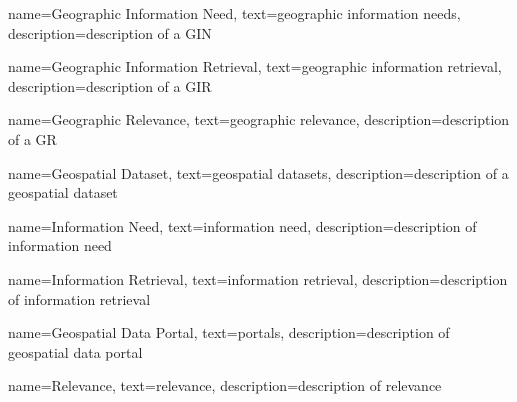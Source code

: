 
{
    name=Geographic Information Need,
    text=geographic information needs,
    description=description of a GIN
}

{
    name=Geographic Information Retrieval,
    text=geographic information retrieval,
    description=description of a GIR
}

{
    name=Geographic Relevance,
    text=geographic relevance,
    description=description of a GR
}

{
    name=Geospatial Dataset,
    text=geospatial datasets,
    description=description of a geospatial dataset
}

{
    name=Information Need,
    text=information need,
    description=description of information need
}

{
    name=Information Retrieval,
    text=information retrieval,
    description=description of information retrieval
}

{
    name=Geospatial Data Portal,
    text=portals,
    description=description of geospatial data portal
}

{
    name=Relevance,
    text=relevance,
    description=description of relevance
}